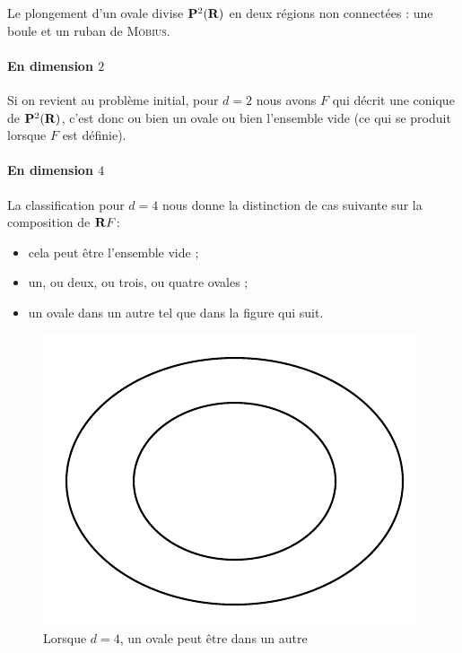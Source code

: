 \documentclass{livre}
\begin{document}
Le plongement d'un ovale divise $\mathbf{P}^{2}(\mathbf{R})$ en deux régions non connectées : une boule et un ruban de \textsc{Möbius}.

\paragraph{En dimension $2$}Si on revient au problème initial, pour $d=2$ nous avons $F$ qui décrit une conique de $\mathbf{P}^{2}(\mathbf{R})$, c'est donc ou bien un ovale ou bien l'ensemble vide (ce qui se produit lorsque $F$ est définie).


\paragraph{En dimension $4$}La classification pour $d=4$ nous donne la distinction de cas suivante sur la composition de $\mathbf{R} F$:
\begin{itemize}
\item cela peut être l'ensemble vide ;
\item un, ou deux, ou trois, ou quatre ovales ;
\item un ovale dans un autre tel que dans la figure qui suit.
\end{itemize}

\begin{figure}[H]
\begin{center}
\includegraphics[scale=0.6]{fig1}
\end{center}
\caption{Lorsque $d=4$, un ovale peut être dans un autre}\label{fig1}
\end{figure}
\end{document}
